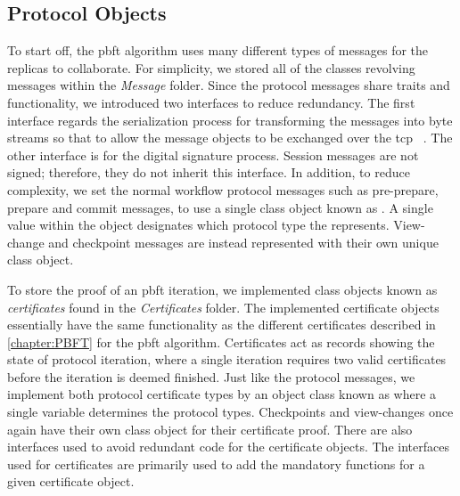 
\subsection{Protocol Objects}
To start off, the \ac{pbft} algorithm uses many different types of messages for the replicas to collaborate. For simplicity, we stored all of the classes revolving messages within the \emph{Message} folder. Since the protocol messages share traits and functionality, we introduced two interfaces to reduce redundancy. The first interface regards the serialization process for transforming the messages into byte streams so that to allow the message objects to be exchanged over the \ac{tcp} ~\cite{WEB:tcp}. The other interface is for the digital signature process. Session messages are not signed; therefore, they do not inherit this interface. In addition, to reduce complexity, we set the normal workflow protocol messages such as pre-prepare, prepare and commit messages, to use a single class object known as . A single value within the  object designates which protocol type the  represents. View-change and checkpoint messages are instead represented with their own unique class object.

To store the proof of an \ac{pbft} iteration, we implemented class objects known as \emph{certificates} found in the \emph{Certificates} folder. The implemented certificate objects essentially have the same functionality as the different certificates described in \autoref{chapter:PBFT} for the \ac{pbft} algorithm. Certificates act as records showing the state of protocol iteration, where a single iteration requires two valid certificates before the iteration is deemed finished. Just like the protocol messages, we implement both protocol certificate types by an object class known as  where a single variable determines the protocol types. Checkpoints and view-changes once again have their own class object for their certificate proof. There are also interfaces used to avoid redundant code for the certificate objects. The interfaces used for certificates are primarily used to add the mandatory functions for a given certificate object. 

